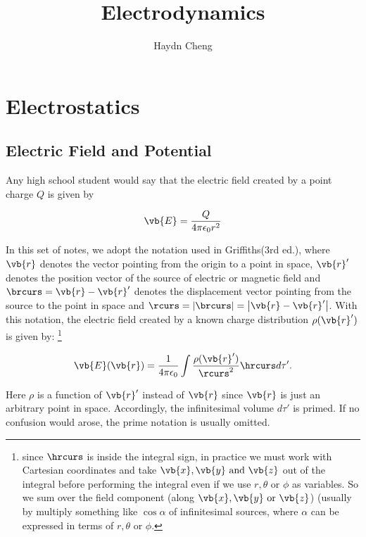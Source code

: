 \documentclass[a4paper,12pt]{report}
\title{Electrodynamics}
\author{Haydn Cheng}
\date{}
\begin{document}
	\maketitle
	\tableofcontents
	
	\chapter{Electrostatics}
	\section{Electric Field and Potential}
	
	Any high school student would say that the electric field created by a point charge \(Q\) is given by
	
	\begin{equation}
		\vb{E} = \frac{Q}{4\pi \epsilon_0r^2} 
	\end{equation}
	
	In this set of notes, we adopt the notation used in Griffiths(3rd ed.), where \(\vb{r}\)  denotes the vector pointing from the origin to a point in space, \(\vb{r}'\) denotes the position vector of the source of electric or magnetic field and \(\brcurs = \vb{r} - \vb{r}'\) denotes the displacement vector pointing from the source to the point in space and \(\rcurs = \left| \brcurs  \right| = \left| \vb{r} -\vb{r} ' \right|  \). With this notation, the electric field created by a known charge distribution \(\rho (\vb{r}')\)  is given by: \footnote{since \(\hrcurs \) is inside the integral sign, in practice we must work with Cartesian coordinates and take \(\vb{x}, \vb{y} \text{ and } \vb{z} \) out of the integral before performing the integral even if we use \(r, \theta \text{ or } \phi\) as variables. So we sum over the field component (along \(\vb{x}, \vb{y} \text{ or } \vb{z}\)) (usually by multiply something like \(\cos \alpha\) of infinitesimal sources, where \(\alpha \) can be expressed in terms of \(r, \theta \text{ or } \phi\).}
	
	\begin{equation}
		\vb{E}(  \vb{r}) = \frac{1}{4\pi \epsilon_0} \int \frac{\rho ( \vb{r}' ) }{\rcurs ^2}  \hrcurs d\tau '. \label{comb} 
	\end{equation}
	
	Here \(\rho \) is a function of \(\vb{r}'\) instead of \(\vb{r}\) since \(\vb{r}\) is just an arbitrary point in space. Accordingly, the infinitesimal volume \(d\tau '\) is primed. If no confusion would arose, the prime notation is usually omitted.
	
\end{document}

